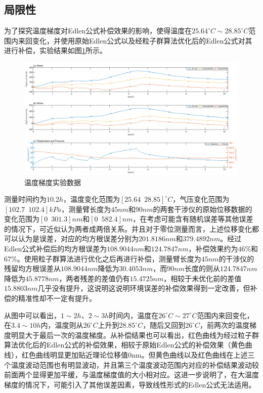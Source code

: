 \subsection{局限性}
为了探究温度梯度对Edlen公式补偿效果的影响，使得温度在$25.64^{\circ}C\sim28.85^{\circ}C$范围内来回变化，并使用原始Edlen公式以及经粒子群算法优化后的Edlen公式对其进行补偿，实验结果如图\ref{fig:温度梯度实验数据}所示。
\begin{figure}[htb]
  \centering
  \includegraphics[width=14cm]{fig/4-fig/温度梯度实验数据.jpg}
  \caption{温度梯度实验数据}
  \label{fig:温度梯度实验数据}
\end{figure}

测量时间约为$10.2h$，温度变化范围为$[25.64\,\,\,28.85]^{\circ}C$，气压变化范围为$[102.7\,\,\,102.4]kPa$，测量臂长度为$45nm$和$90nm$的两套干涉仪的原始位移数据的变化范围为$[0 \,\,\, 301.3]nm$和$[0\,\,\,582.4]nm$，在考虑可能含有随机误差等其他误差的情况下，可近似认为两者成两倍关系。并且对于零位测量而言，上述位移变化都可以认为是误差，对应的均方根误差分别为$201.8186nm$和$379.4892nm$。经过Edlen公式补偿后的均方根误差为$108.9044nm$和$124.7847nm$，补偿效果约为$46\%$和$67\%$。使用粒子群算法进行优化之后再进行补偿，测量臂长度为$45nm$的干涉仪的残留均方根误差从$108.9044nm$降低为$30.4053 nm$，而$90nm$长度的则从$124.7847nm$降低为$45.8778nm$，两者残差的差值仍有$15.4725nm$，相较于未优化前的差值$15.8803nm$几乎没有提升，这说明这说明环境误差的补偿效果得到一定改善，但补偿的精准性却不一定有提升。

从图中可以看出，$1\sim2h$、$2\sim3h$时间内，温度在$26^{\circ}C\sim27^{\circ}C$范围内来回变化，在$3.4\sim10h$内，温度则从$26^{\circ}C$上升到$28.85^{\circ}C$，随后又回到$26^{\circ}C$，前两次的温度梯度明显大于最后一次的温度梯度。从补偿结果也可以看出，红色曲线为经过粒子群算法优化后的Edlen公式的补偿效果，相较于原始Edlen公式的补偿效果（黄色曲线），红色曲线明显更加贴近理论位移值0nm。但黄色曲线以及红色曲线在上述三个温度波动范围也有明显波动，并且第三个温度波动范围内对应的补偿结果波动较前面两个显得更加平缓，与温度梯度值的大小相对应。这进一步说明了，在大温度梯度的情况下，可能引入了其他误差因素，导致线性形式的Edlen公式无法适用。

